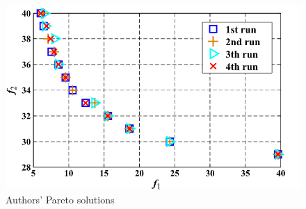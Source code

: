 \begin{figure}
    \includegraphics[width=\linewidth]{Images/authors_results.png}
    \caption{Authors' Pareto solutions}
    \label{fig:authors_results}
\end{figure}
